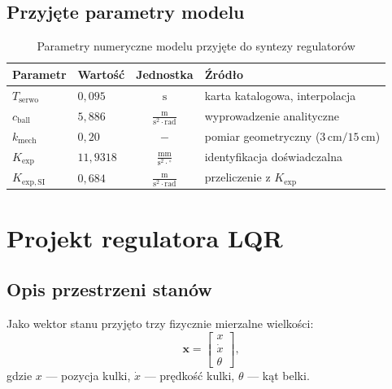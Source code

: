 \subsection{Przyjęte parametry modelu}
 
\begin{table}[H]
\centering
\renewcommand{\arraystretch}{1.6}
\caption{Parametry numeryczne modelu przyjęte do syntezy regulatorów}
\label{tab:params}
\begin{tabular}{l l c >{\raggedright\arraybackslash}p{5.5cm}}
\hline
\textbf{Parametr} & \textbf{Wartość} & \textbf{Jednostka} & \textbf{Źródło} \\
\hline
$T_\mathrm{serwo}$  & $0{,}095$    & $\mathrm{s}$
    & karta katalogowa, interpolacja  \\
$c_\mathrm{ball}$   & $5{,}886$    & $\tfrac{\mathrm{m}}{\mathrm{s}^2 \cdot \mathrm{rad}}$
    & wyprowadzenie analityczne \\
$k_\mathrm{mech}$   & $0{,}20$     & $-$
    & pomiar geometryczny ($3\,\mathrm{cm}/15\,\mathrm{cm}$) \\
$K_\mathrm{exp}$    & $11{,}9318$  & $\tfrac{\mathrm{mm}}{\mathrm{s}^2 \cdot {^\circ}}$
    & identyfikacja doświadczalna \\
$K_\mathrm{exp,SI}$ & $0{,}684$    & $\tfrac{\mathrm{m}}{\mathrm{s}^2 \cdot \mathrm{rad}}$
    & przeliczenie z $K_\mathrm{exp}$ \\
\hline
\end{tabular}
\end{table}

\section{Projekt regulatora LQR}

\subsection{Opis przestrzeni stanów}

Jako wektor stanu przyjęto trzy fizycznie mierzalne wielkości:
\begin{equation}
  \mathbf{x} = \begin{bmatrix} x \\ \dot{x} \\ \theta \end{bmatrix},
\end{equation}
gdzie $x$ — pozycja kulki, $\dot{x}$ — prędkość kulki, $\theta$ — kąt belki.

